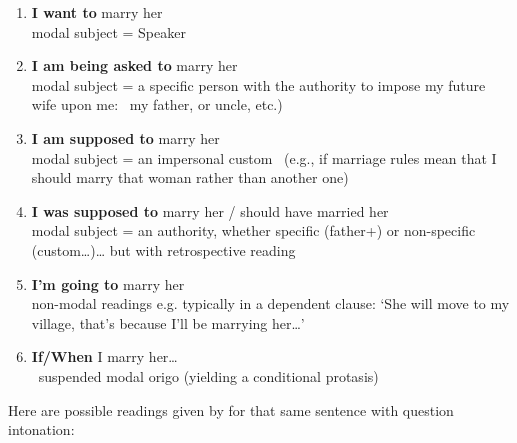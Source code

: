 \documentclass[output=paper]{langsci/langscibook}
\begin{document}
\begin{enumerate}[label=\alph*)]
	\item \label{ex:rumsey:ar15a} \textbf{I want to} marry her\\modal subject = Speaker
	\item \label{ex:rumsey:ar15b} \textbf{I am being asked to} marry her\\modal subject =  a specific person with the authority to impose my future wife upon me:  my father, 				or uncle, etc.)
	\item \label{ex:rumsey:ar15c} \textbf{I am supposed to} marry her\\modal subject = an impersonal custom  (e.g., if marriage rules mean that I should marry that woman rather than another one)
	\item \label{ex:rumsey:ar15d} \textbf{I was supposed to} marry her / should have married her\\modal subject = an authority, whether specific (father+) or non-specific (custom…)… but with retrospective reading
	\item \label{ex:rumsey:ar15e} \textbf{I'm going to} marry her\\non-modal readings e.g. typically in a dependent clause: `She will move to my village, that's because I'll be marrying her…'
	\item \label{ex:rumsey:ar15f} \textbf{If/When} I marry her…\\ suspended modal origo (yielding a conditional protasis)
\end{enumerate}

Here are possible readings given by \citeauthor{Francois2003} for that same sentence with question intonation:
\end{document}
